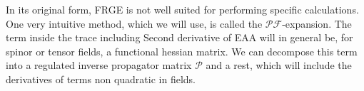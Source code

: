 \documentclass[11pt, a4paper]{article}
\begin{document}
In its original form, FRGE is not well suited for performing specific calculations. One very intuitive method, which
we will use, is called the $\mathcal{PF}$-expansion. 
The term inside the trace including Second derivative of EAA
will in general be, for spinor or tensor fields, a functional hessian matrix. We can decompose this term into a
regulated inverse propagator matrix $\mathcal{P}$ and a rest, which will include the derivatives of terms non quadratic in fields.
\end{document}
